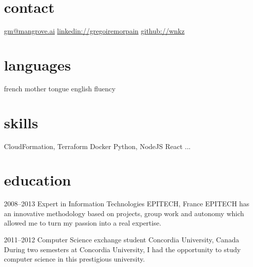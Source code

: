 \documentclass[print]{cv-a4}
\begin{document}


\begin{aside} %
\section{contact}
\href{mailto:gm@mangrove.ai}{gm@mangrove.ai}
\href{https://www.linkedin.com/in/gregoiremorpain/en}{linkedin://gregoiremorpain}
\href{https://github.com/wnkz}{github://wnkz}
\section{languages}
french mother tongue
english fluency
\section{skills}
CloudFormation, Terraform
Docker
Python, NodeJS
React
...
\end{aside}


\section{education}

\begin{entrylist}


\entry
{2008--2013}
{Expert {\normalfont in Information Technologies}}
{EPITECH, France}
{EPITECH has an innovative methodology based on projects, group work and autonomy which allowed me to turn my passion into a real expertise.}


\entry
{2011--2012}
{Computer Science {\normalfont exchange student}}
{Concordia University, Canada}
{During two semesters at Concordia University, I had the opportunity to study computer science in this prestigious university.}


\end{entrylist}
\end{document}
